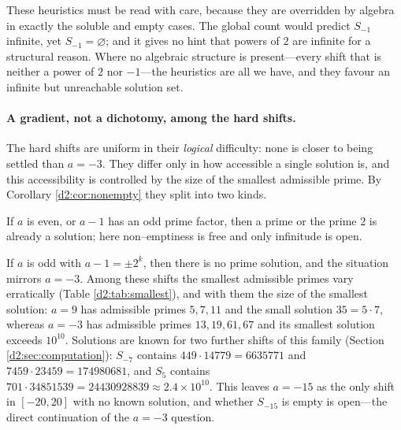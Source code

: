 \documentclass[a4paper]{article}
\theoremstyle{plain}
\theoremstyle{definition}
\theoremstyle{remark}
\begin{document}
These heuristics must be read with care, because they are overridden by algebra in exactly the soluble and empty cases. The global count would predict $S_{-1}$ infinite, yet $S_{-1}=\varnothing$; and it gives no hint that powers of $2$ are infinite for a structural reason. Where no algebraic structure is present---every shift that is neither a power of $2$ nor $-1$---the heuristics are all we have, and they favour an infinite but unreachable solution set.

\paragraph{A gradient, not a dichotomy, among the hard shifts.} The hard shifts are uniform in their \emph{logical} difficulty: none is closer to being settled than $a=-3$. They differ only in how accessible a single solution is, and this accessibility is controlled by the size of the smallest admissible prime. By Corollary \ref{d2:cor:nonempty} they split into two kinds.

If $a$ is even, or $a-1$ has an odd prime factor, then a prime or the prime $2$ is already a solution; here non--emptiness is free and only infinitude is open.

If $a$ is odd with $a-1=\pm2^{k}$, then there is no prime solution, and the situation mirrors $a=-3$. Among these shifts the smallest admissible primes vary erratically (Table \ref{d2:tab:smallest}), and with them the size of the smallest solution: $a=9$ has admissible primes $5,7,11$ and the small solution $35=5\cdot7$, whereas $a=-3$ has admissible primes $13,19,61,67$ and its smallest solution exceeds $10^{10}$. Solutions are known for two further shifts of this family (Section \ref{d2:sec:computation}): $S_{-7}$ contains $449\cdot14779=6635771$ and $7459\cdot23459=174980681$, and $S_5$ contains $701\cdot34851539=24430928839\approx2.4\times10^{10}$. This leaves $a=-15$ as the only shift in $[-20,20]$ with no known solution, and whether $S_{-15}$ is empty is open---the direct continuation of the $a=-3$ question.
\end{document}
